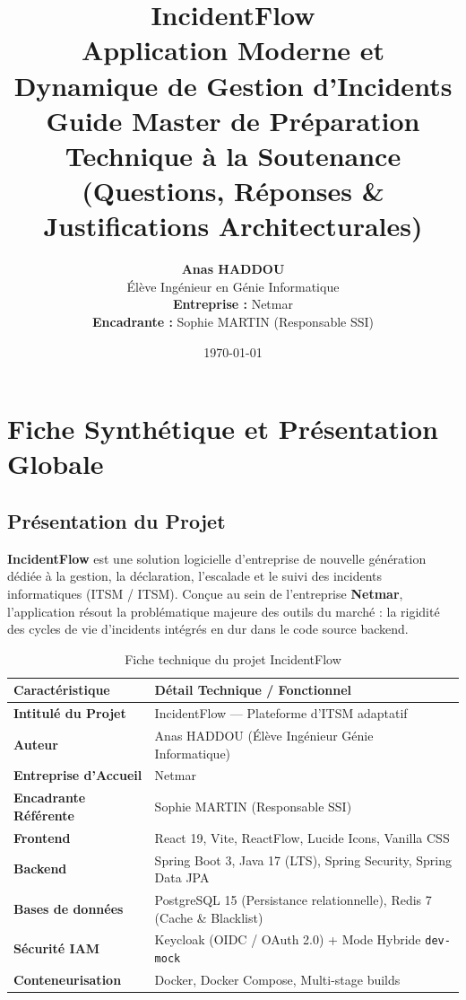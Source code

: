\documentclass[12pt,a4paper]{article}
\title{
    \vspace{1.5cm}
    \textcolor{secondary}{\textbf{\Huge IncidentFlow}}\\[0.5cm]
    \textcolor{primary}{\Large Application Moderne et Dynamique de Gestion d'Incidents}\\[1.5cm]
    \textbf{\Large Guide Master de Préparation Technique à la Soutenance \\ (Questions, Réponses \& Justifications Architecturales)}
    \vspace{2cm}
}
\author{
    \textbf{Anas HADDOU} \\
    Élève Ingénieur en Génie Informatique \\[1cm]
    \textbf{Entreprise :} Netmar \\
    \textbf{Encadrante :} Sophie MARTIN (Responsable SSI)
}
\date{\today}
\begin{document}
\maketitle
\thispagestyle{empty}
\clearpage

\tableofcontents
\clearpage

\section{Fiche Synthétique et Présentation Globale}

\subsection{Présentation du Projet}
\textbf{IncidentFlow} est une solution logicielle d'entreprise de nouvelle génération dédiée à la gestion, la déclaration, l'escalade et le suivi des incidents informatiques (ITSM / ITSM). Conçue au sein de l'entreprise \textbf{Netmar}, l'application résout la problématique majeure des outils du marché : la rigidité des cycles de vie d'incidents intégrés en dur dans le code source backend.

\begin{table}[h!]
\centering
\begin{tabular}{ll}
\toprule
\textbf{Caractéristique} & \textbf{Détail Technique / Fonctionnel} \\
\midrule
\textbf{Intitulé du Projet} & IncidentFlow — Plateforme d'ITSM adaptatif \\
\textbf{Auteur} & Anas HADDOU (Élève Ingénieur Génie Informatique) \\
\textbf{Entreprise d'Accueil} & Netmar \\
\textbf{Encadrante Référente} & Sophie MARTIN (Responsable SSI) \\
\textbf{Frontend} & React 19, Vite, ReactFlow, Lucide Icons, Vanilla CSS \\
\textbf{Backend} & Spring Boot 3, Java 17 (LTS), Spring Security, Spring Data JPA \\
\textbf{Bases de données} & PostgreSQL 15 (Persistance relationnelle), Redis 7 (Cache \& Blacklist) \\
\textbf{Sécurité IAM} & Keycloak (OIDC / OAuth 2.0) + Mode Hybride \texttt{dev-mock} \\
\textbf{Conteneurisation} & Docker, Docker Compose, Multi-stage builds \\
\bottomrule
\end{tabular}
\caption{Fiche technique du projet IncidentFlow}
\end{table}
\end{document}
